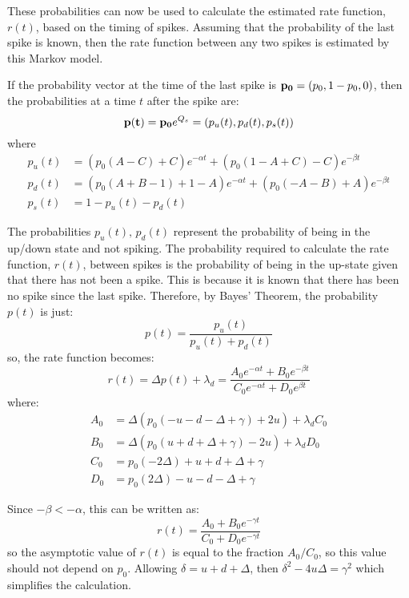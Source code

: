 These probabilities can now be used to calculate the estimated rate function, $r(t)$, based on the timing of spikes.  Assuming that the probability of the last spike is known, then the rate function between any two spikes is estimated by this Markov model. 

If the probability vector at the time of the last spike is ${\bf p_0}=(p_0, 1-p_0,0)$, then the probabilities at a time $t$ after the spike are:
\begin{equation}
{\bf p(t)} = {\bf p_0}e^{Q_s} = (p_u(t),p_d(t),p_s(t))
\end{equation}
where
\begin{equation}
\begin{split}
p_u(t) &= (p_0(A-C)+C)e^{-\alpha t}+(p_0(1-A+C)-C)e^{-\beta t}\\
p_d(t) &= (p_0(A+B-1)+1-A)e^{-\alpha t}+(p_0(-A-B)+A)e^{-\beta t}\\
p_s(t) &= 1 - p_u(t) - p_d(t)
\end{split}
\end{equation}

The probabilities $p_u(t), \,p_d(t)$ represent the probability of being in the up/down state and not spiking.  The probability required to calculate the rate function, $r(t)$, between spikes is the probability of being in the up-state given that there has not been a spike.  This is because it is known that there has been no spike since the last spike.  Therefore, by Bayes' Theorem, the probability $p(t)$ is just:
\begin{equation}
p(t)  = \frac{p_u(t)}{p_u(t) + p_d(t)}
\end{equation}
so, the rate function becomes:
\begin{equation}\label{roft}
r(t) = \Delta p(t) + \lambda_d = \frac{A_0e^{-\alpha t}+B_0e^{-\beta t}}{C_0e^{-\alpha t} + D_0e^{\beta t}}
\end{equation}
where:
\begin{equation}
\begin{split}
\label{abcd}
A_0 & = \Delta(p_0(-u-d-\Delta + \gamma)+2u)+\lambda_dC_0\\
B_0 & =\Delta(p_0(u+d+\Delta + \gamma)-2u)+\lambda_dD_0\\
C_0 & = p_0(-2\Delta)+u+d+\Delta+\gamma\\
D_0 & = p_0(2\Delta) -u-d-\Delta + \gamma
\end{split}
\end{equation}

Since $-\beta<-\alpha$, this can be written as:
\begin{equation}
r(t) = \frac{A_0+B_0e^{-\gamma t}}{C_0 + D_0e^{-\gamma t}}
\end{equation}
so the asymptotic value of $r(t)$ is equal to the fraction $A_0/C_0$, so this value should not depend on $p_0$.  Allowing $\delta=u+d+\Delta$, then $\delta^2 -4u\Delta= \gamma^2$ which simplifies the calculation.

